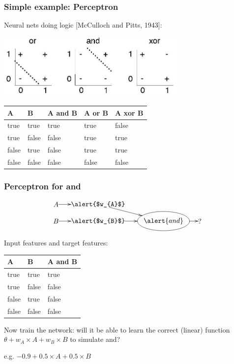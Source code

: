 \documentclass{beamer}
\begin{document}
\begin{frame}
\frametitle{Simple example: Perceptron}

Neural nets doing logic [McCulloch and Pitts, 1943]:

\begin{center}
\includegraphics[width=0.7\textwidth]{xor}
\end{center}
\begin{center}
\begin{tabular}{|ll |l |l |l|}
\hline
 A & B & A \alert{and} B &  A \alert{or} B & A \alert{xor} B \\ \hline
true & true & true & true & false \\
true & false & false & true & true \\
false & true & false & true & true \\
false & false & false & false & false \\
\hline 
\end{tabular}
\end{center}

\end{frame}


\begin{frame}
\frametitle{Perceptron for \alert{and}}


$$\xymatrix@R=0.5pc@C=0pc{
&*\txt{$A$}\ar[rrrr]&&&&*\txt{\alert{$w_{A}$}}\ar[rrrrd]&&&&&&&&\\
&*\txt{$B$}\ar[rrrr]&&&&*\txt{\alert{$w_{B}$}}\ar[rrrr]&&&&*+++[o][F]{\alert{and}}\ar[rrr]&&&*\txt{?}&\\
} $$

Input features and target features:

\begin{center}
\begin{tabular}{|ll |l |}
\hline
 A & B & A \alert{and} B  \\ \hline
true & true & true  \\
true & false & false \\
false & true & false \\
false & false & false \\
\hline 
\end{tabular}
\end{center}
\pause

Now train the network: will it be able to \alert{learn} the correct (linear) function $\theta + w_A \times A + w_B \times B$ to simulate \alert{and}? 

\pause 

 e.g. $-0.9 + 0.5 \times A + 0.5 \times B$

\end{frame}
\end{document}
